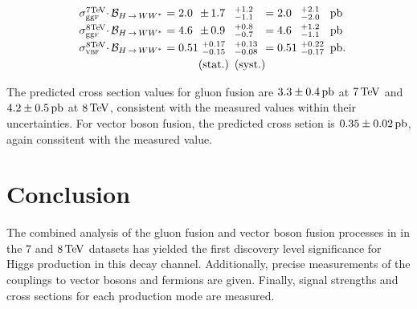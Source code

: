 \begin{equation}
\begin{array}{lllllll}
\np\sigma_{\scggF}^{7\!\TeV}{\!\CDOT}\mathcal{B}_{\HWW}\np&= 2.0 \np\no&{\PM}1.7            \no\!&^{+1.2}_{-1.1}  \np\no&=2.0 \np\no&\,\,^{+2.1}_{-2.0}   \np&\pb \nq\\ \clineskip
\np\sigma_{\scggF}^{8\!\TeV}{\!\CDOT}\mathcal{B}_{\HWW}\np&= 4.6 \np\no&{\PM}0.9            \no\!&^{+0.8}_{-0.7}  \np\no&=4.6 \np\no&\,\,^{+1.2}_{-1.1}    \np&\pb \nq\\ \clineskip
\np\sigma_{\scVX }^{8\!\TeV}{\!\CDOT}\mathcal{B}_{\HWW}\np&= 0.51\np\no&\,\,^{+0.17}_{-0.15}\no\!&^{+0.13}_{-0.08}\np\no&=0.51\np\no&\,\,^{+0.22}_{-0.17} \np&\pb.\nq\\ \clineskip
\np                                                       &      \np\no&\textrm{(stat.)}    \no\!&\textrm{(syst.)}\np\no
\end{array}
\label{eqn:xsec_vals}
\end{equation}

The predicted cross section values for gluon fusion are $3.3 \pm 0.4 \mbox{\,pb}$ at $7 \TeV$ and $4.2 \pm 0.5 \mbox{\,pb}$ at $8 \TeV$, consistent with the measured values within their uncertainties. For vector boson fusion, the predicted cross setion is $0.35 \pm 0.02 \mbox{\,pb}$, again conssitent with the measured value. 

\section{Conclusion}

The combined analysis of the gluon fusion and vector boson fusion processes in \HWWfull in the $7$ and $8 \TeV$ datasets has yielded the first discovery level significance for Higgs production in this decay channel. Additionally, precise measurements of the couplings to vector bosons and fermions are given. Finally, signal strengths and cross sections for each production mode are measured. 



